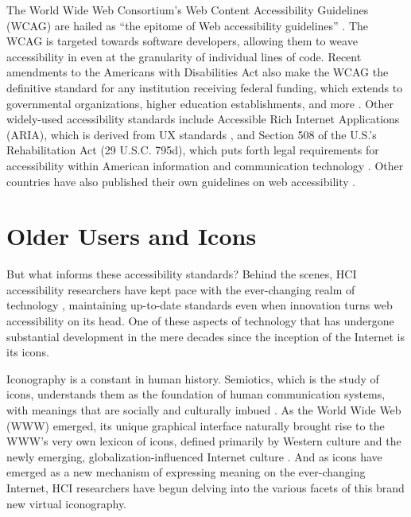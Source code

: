 \documentclass[12pt,twoside]{reedthesis}
\begin{document}
    The World Wide Web Consortium's Web Content Accessibility Guidelines (WCAG) are hailed as \enquote{the epitome of Web accessibility guidelines} \cite{kurniawan_research-derived_2005}. The WCAG is targeted towards software developers, allowing them to weave accessibility in even at the granularity of individual lines of code. Recent amendments to the Americans with Disabilities Act also make the WCAG the definitive standard for any institution receiving federal funding, which extends to governmental organizations, higher education establishments, and more \cite{ada_fact_2024}. Other widely-used accessibility standards include Accessible Rich Internet Applications (ARIA), which is derived from UX standards \cite{putnam_it_2023}, and Section 508 of the U.S.'s Rehabilitation Act (29 U.S.C. 795d), which puts forth legal requirements for accessibility within American information and communication technology \cite{kurniawan_research-derived_2005, noauthor_section508gov_nodate, noauthor_section508gov_nodate-1, henry2006}. Other countries have also published their own guidelines on web accessibility \cite{kurniawan_research-derived_2005}. 

\section{Older Users and Icons}\label{2.3}
        But what informs these accessibility standards? Behind the scenes, HCI accessibility researchers have kept pace with the ever-changing realm of technology \cite{chong_bad_2023}, maintaining up-to-date standards even when innovation turns web accessibility on its head. One of these aspects of technology that has undergone substantial development in the mere decades since the inception of the Internet is its icons. 
        
        Iconography is a constant in human history. Semiotics, which is the study of icons, understands them as the foundation of human communication systems, with meanings that are socially and culturally imbued \cite{ma_semiotics_1995}. As the World Wide Web (WWW) emerged, its unique graphical interface naturally brought rise to the WWW's very own lexicon of icons, defined primarily by Western culture and the newly emerging, globalization-influenced Internet culture \cite{myers_brief_1998, ma_semiotics_1995, knight_cultural_2009}. And as icons have emerged as a new mechanism of expressing meaning on the ever-changing Internet, HCI researchers have begun delving into the various facets of this brand new virtual iconography.
\end{document}
